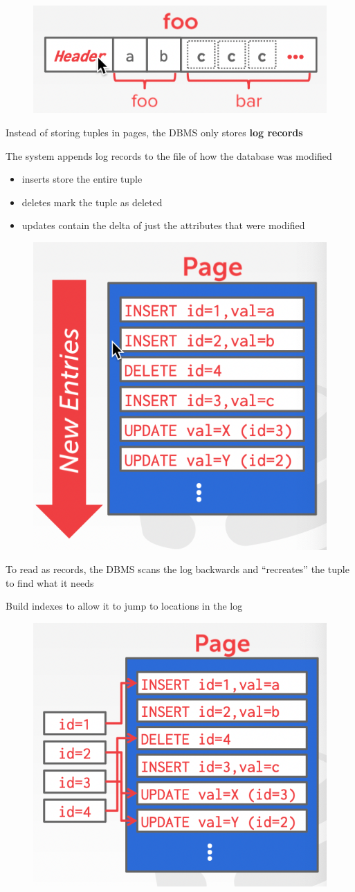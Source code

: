 \documentclass[11pt]{article}
\begin{document}
\begin{figure}[htbp]
\centering
\includegraphics[width=.3\textwidth]{../images/15445/6.png}
\label{}
\end{figure}

Instead of storing tuples in pages, the DBMS only stores \textbf{log records}

The system appends log records to the file of how the database was modified
\begin{itemize}
\item inserts store the entire tuple
\item deletes mark the tuple as deleted
\item updates contain the delta of just the attributes that were modified
\end{itemize}

\begin{figure}[htbp]
\centering
\includegraphics[width=.4\textwidth]{../images/15445/7.png}
\label{}
\end{figure}

To read as records, the DBMS scans the log backwards and ``recreates'' the tuple to find what it
needs

Build indexes to allow it to jump to locations in the log
\begin{figure}[htbp]
\centering
\includegraphics[width=.4\textwidth]{../images/15445/8.png}
\label{}
\end{figure}
\end{document}

